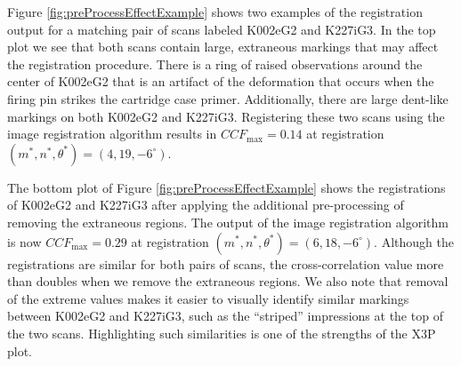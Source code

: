 \documentclass[11pt,]{isuthesis}
\begin{document}
Figure \ref{fig:preProcessEffectExample} shows two examples of the registration output for a matching pair of scans labeled K002eG2 and K227iG3.
In the top plot we see that both scans contain large, extraneous markings that may affect the registration procedure.
There is a ring of raised observations around the center of K002eG2 that is an artifact of the deformation that occurs when the firing pin strikes the cartridge case primer.
Additionally, there are large dent-like markings on both K002eG2 and K227iG3.
Registering these two scans using the image registration algorithm results in \(CCF_{\max} = 0.14\) at registration \((m^*,n^*,\theta^*) = (4,19,-6^\circ)\).

The bottom plot of Figure \ref{fig:preProcessEffectExample} shows the registrations of K002eG2 and K227iG3 after applying the additional pre-processing of removing the extraneous regions.
The output of the image registration algorithm is now \(CCF_{\max} = 0.29\) at registration \((m^*,n^*,\theta^*) = (6,18,-6^\circ)\).
Although the registrations are similar for both pairs of scans, the cross-correlation value more than doubles when we remove the extraneous regions.
We also note that removal of the extreme values makes it easier to visually identify similar markings between K002eG2 and K227iG3, such as the ``striped'' impressions at the top of the two scans.
Highlighting such similarities is one of the strengths of the X3P plot.
\end{document}
